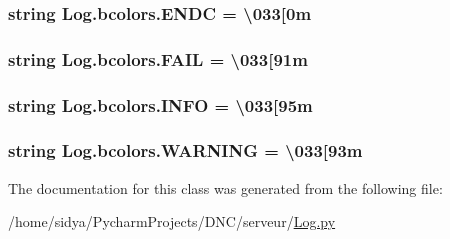 \subsubsection[{E\+N\+D\+C}]{\setlength{\rightskip}{0pt plus 5cm}string Log.\+bcolors.\+E\+N\+D\+C = \textquotesingle{} \textbackslash{}033\mbox{[}0m \textquotesingle{}\hspace{0.3cm}{\ttfamily [static]}}\label{class_log_1_1bcolors_a15ad99f841e6570687d302f7b7828acc}
\hypertarget{class_log_1_1bcolors_a998357f4b91b221875352c09c8482d59}{}
\subsubsection[{F\+A\+I\+L}]{\setlength{\rightskip}{0pt plus 5cm}string Log.\+bcolors.\+F\+A\+I\+L = \textquotesingle{} \textbackslash{}033\mbox{[}91m \textquotesingle{}\hspace{0.3cm}{\ttfamily [static]}}\label{class_log_1_1bcolors_a998357f4b91b221875352c09c8482d59}
\hypertarget{class_log_1_1bcolors_abebeed8fb41205fcff45bfa1f5c03c0a}{}
\subsubsection[{I\+N\+F\+O}]{\setlength{\rightskip}{0pt plus 5cm}string Log.\+bcolors.\+I\+N\+F\+O = \textquotesingle{} \textbackslash{}033\mbox{[}95m \textquotesingle{}\hspace{0.3cm}{\ttfamily [static]}}\label{class_log_1_1bcolors_abebeed8fb41205fcff45bfa1f5c03c0a}
\hypertarget{class_log_1_1bcolors_a709fba90e14f4a669bd94711df53665e}{}
\subsubsection[{W\+A\+R\+N\+I\+N\+G}]{\setlength{\rightskip}{0pt plus 5cm}string Log.\+bcolors.\+W\+A\+R\+N\+I\+N\+G = \textquotesingle{} \textbackslash{}033\mbox{[}93m \textquotesingle{}\hspace{0.3cm}{\ttfamily [static]}}\label{class_log_1_1bcolors_a709fba90e14f4a669bd94711df53665e}


The documentation for this class was generated from the following file\+:\begin{DoxyCompactItemize}
\item 
/home/sidya/\+Pycharm\+Projects/\+D\+N\+C/serveur/\hyperlink{_log_8py}{Log.\+py}\end{DoxyCompactItemize}
